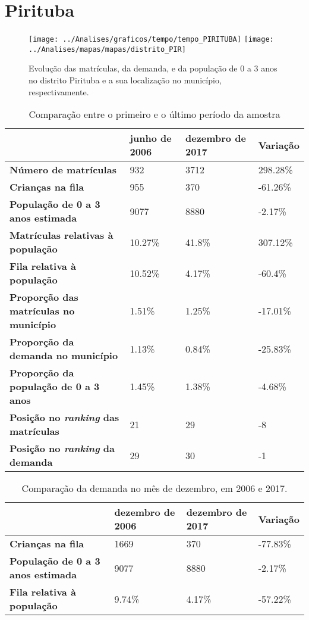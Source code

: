 \section{Pirituba}
\begin{figure}[H]
\centering
\texttt{[image: ../Analises/graficos/tempo/tempo\_PIRITUBA]}
\texttt{[image: ../Analises/mapas/mapas/distrito\_PIR]}
\caption{Evolução das matrículas, da demanda, e da população de 0 a 3 anos no distrito Pirituba e a sua localização no município, respectivamente.}
\end{figure}
\begin{table}[H]
\begin{tabular}{l|l|l|l}
\textbf{}                                      & \textbf{junho de 2006}       & \textbf{dezembro de 2017}    & \textbf{Variação} \\ \hline
\textbf{Número de matrículas}                  & 932 & 3712 & 298.28\% \\ \hline
\textbf{Crianças na fila}                      & 955 & 370 & -61.26\% \\ \hline
\textbf{População de 0 a 3 anos estimada}      & 9077 & 8880 & -2.17\% \\ \hline
\textbf{Matrículas relativas à população}      & 10.27\% & 41.8\% & 307.12\% \\ \hline
\textbf{Fila relativa à população}             & 10.52\% & 4.17\% & -60.4\% \\ \hline
\textbf{Proporção das matrículas no município} & 1.51\% & 1.25\% & -17.01\% \\ \hline
\textbf{Proporção da demanda no município}     & 1.13\% & 0.84\% & -25.83\% \\ \hline
\textbf{Proporção da população de 0 a 3 anos}  & 1.45\% & 1.38\% & -4.68\% \\ \hline
\textbf{Posição no \textit{ranking} das matrículas}     & 21 & 29 & -8 \\ \hline
\textbf{Posição no \textit{ranking} da demanda}         & 29 & 30 & -1 \\ 
\end{tabular}
\caption{Comparação entre o primeiro e o último período da amostra}
\end{table}
\begin{table}[H]
\begin{tabular}{l|l|l|l}
\textbf{}                                 & \textbf{dezembro de 2006} & \textbf{dezembro de 2017} & \textbf{Variação} \\ \hline
\textbf{Crianças na fila}                      & 1669 & 370 & -77.83\% \\ \hline
\textbf{População de 0 a 3 anos estimada}      & 9077 & 8880 & -2.17\% \\ \hline
\textbf{Fila relativa à população}             & 9.74\% & 4.17\% & -57.22\% \\
\end{tabular}
\caption{Comparação da demanda no mês de dezembro, em 2006 e 2017.}
\end{table}
